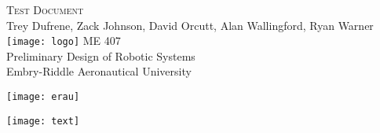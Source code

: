 \begin{titlepage}
\flushleft
\doublespacing
\Large
\textsc{Test Document} \\
\normalsize
Trey Dufrene, Zack Johnson, David Orcutt, Alan Wallingford, Ryan Warner
\vfill
\center
\texttt{[image: logo]}
\vfill
\flushleft
ME 407 \\
Preliminary Design of Robotic Systems \\
Embry-Riddle Aeronautical University \\
\vspace{2ex}
\begin{minipage}[c]{.5\textwidth}
\flushleft
\texttt{[image: erau]}
\end{minipage}%
\begin{minipage}[c]{.5\textwidth}
\flushright
\texttt{[image: text]}
\end{minipage}
\end{titlepage}
